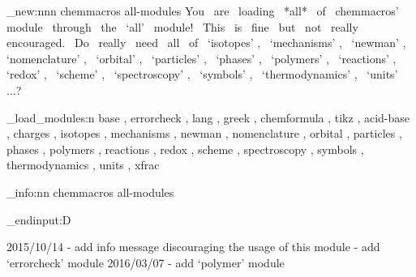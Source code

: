 %
%
%
%
%

\msg_new:nnn {chemmacros} {all-modules}
  {
    You~ are~ loading~ *all*~ of~ chemmacros'~ module~ through~ the~ `all'~
    module!~ This~ is~ fine~ but~ not~ really~ encouraged.~ Do~ really~ need~
    all~ of~ `isotopes' ,~ `mechanisms' ,~ `newman' ,~ `nomenclature' ,~
    `orbital' ,~ `particles' ,~ `phases' ,~ `polymers' ,~ `reactions' ,~
    `redox' ,~ `scheme' ,~ `spectroscopy' ,~ `symbols' ,~ `thermodynamics' ,~
    `units' ...?
  }

\chemmacros_load_modules:n
  {
     base ,
     errorcheck ,
     lang ,
     greek ,
     chemformula ,
     tikz ,
     acid-base ,
     charges ,
     isotopes ,
     mechanisms ,
     newman ,
     nomenclature ,
     orbital ,
     particles ,
     phases ,
     polymers ,
     reactions ,
     redox ,
     scheme ,
     spectroscopy ,
     symbols ,
     thermodynamics ,
     units ,
     xfrac
  }

\msg_info:nn {chemmacros} {all-modules}

\tex_endinput:D

2015/10/14 - add info message discouraging the usage of this module
           - add `errorcheck' module
2016/03/07 - add `polymer' module

